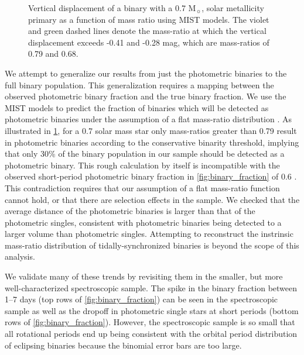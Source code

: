 \documentclass[manuscript]{aastex6}
\newcommand{\gvs}{\authorcomment1}
\begin{document}
\begin{figure}[htb]
    \centering
    \caption{Vertical displacement of a binary with a 0.7 M\(_\sun\), solar
    metallicity primary as a function of mass ratio using MIST models. The
violet and green dashed lines denote the mass-ratio at which the vertical
displacement exceeds -0.41 and -0.28  mag, which are mass-ratios of 0.79 and
0.68.}\label{fig:photometric_massratio}
\end{figure}

We attempt to generalize our results from just the photometric binaries to the
full binary population. This generalization requires a mapping between the
observed photometric binary fraction and the true binary fraction. We use the
MIST models to predict the fraction of binaries which will be detected as
photometric binaries under the assumption of a flat mass-ratio distribution
\citep{Raghavan10}. As illustrated in \cref{fig:photometric_massratio}, for a 
0.7 solar mass star only mass-ratios greater than 0.79 result in photometric
binaries according to the conservative binarity threshold, implying that only
30\% of the binary population in our sample should be detected as a photometric 
binary. This rough calculation by itself is incompatible with the observed 
short-period photometric binary fraction in \cref{fig:binary_fraction} of 0.6
\gvs{Revise this}. 
This contradiction requires that our assumption of a flat mass-ratio function 
cannot hold, or that there are selection effects in the sample. We checked that
the average distance of the photometric binaries is larger than that of the
photometric singles, consistent with photometric binaries being detected to a
larger volume than photometric singles. Attempting to reconstruct the
instrinsic mass-ratio distribution of tidally-synchronized binaries is beyond
the scope of this analysis.

We validate many of these trends by revisiting them in the smaller, but more
well-characterized spectroscopic sample. The spike in the binary fraction
between 1--7 days (top rows of \cref{fig:binary_fraction}) can be seen in the 
spectroscopic sample as well as the dropoff in photometric single stars at
short periods (bottom rows of \cref{fig:binary_fraction}). However, the
spectroscopic sample is so small that all rotational periods end up being
consistent with the orbital period distribution of eclipsing binaries because
the binomial error bars are too large.
\end{document}

